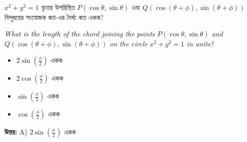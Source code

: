 \documentclass[12pt, a4paper]{article}
\begin{document}
\vspace{2em}

\begin{tcolorbox}[questionbox={প্রশ্ন (Question) 34}]
    \noindent
    $x^2 + y^2 = 1$ বৃত্তের উপরিস্থিত  $P(\cos\theta, \sin\theta)$ এবং    $Q(\cos(\theta + \phi), \sin(\theta + \phi))$ বিন্দুদ্বয়ের সংযোজক জ্যা-এর দৈর্ঘ্য কত একক?
    
    \vspace{0.8em}
    \begin{english}
    \noindent\textit{\color{darkgray}
    What is the length of the chord joining the points $P(\cos\theta, \sin\theta)$ and $Q(\cos(\theta + \phi), \sin(\theta + \phi))$ on the circle $x^2 + y^2 = 1$ in units?
    }
    \end{english}
\end{tcolorbox}

\vspace{1em}
\begin{itemize}[label={}, leftmargin=1cm, itemsep=0.5em]
    \item[\textbf{A)}] $2\sin\left(\frac{\phi}{2}\right)$ একক
    \item[\textbf{B)}]  $2\cos\left(\frac{\phi}{2}\right)$ একক
    \item[\textbf{C)}]  $\sin\left(\frac{\phi}{2}\right)$ একক
    \item[\textbf{D)}]  $\cos\left(\frac{\phi}{2}\right)$ একক
\end{itemize}

\vspace{0.5em}
\begin{tcolorbox}[answerbox]
    \textbf{\color{success} উত্তর:} A) $2\sin\left(\frac{\phi}{2}\right)$ একক
\end{tcolorbox}
\vspace{1em}
\end{document}

